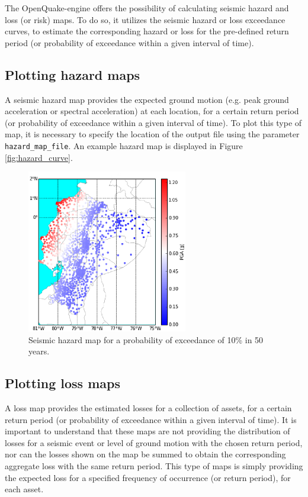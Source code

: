 The OpenQuake-engine offers the possibility of calculating seismic hazard and loss (or risk) maps. To do so, it utilizes the seismic hazard or loss exceedance curves, to estimate the corresponding hazard or loss for the pre-defined return period (or probability of exceedance within a given interval of time).

\subsection{Plotting hazard maps}
\label{subsec:plot-hazard_maps}
A seismic hazard map provides the expected ground motion (e.g. peak ground acceleration or spectral acceleration) at each location, for a certain return period (or probability of exceedance within a given interval of time). To plot this type of map, it is necessary to specify the location of the output file using the parameter \verb=hazard_map_file=. An example hazard map is displayed in Figure \ref{fig:hazard_curve}.

\begin{figure}[htb]
  \centering
      \includegraphics[width=7cm]{figures/hazard_Ecuador.eps}
  \caption{Seismic hazard map for a probability of exceedance of 10\% in 50 years.}
  \label{fig:hazard_map}
\end{figure}

\subsection{Plotting loss maps}
\label{subsec:plot-loss_maps}
A loss map provides the estimated losses for a collection of assets, for a certain return period (or probability of exceedance within a given interval of time). It is important to understand that these maps are not providing the distribution of losses for a seismic event or level of ground motion with the chosen return period, nor can the losses shown on the map be summed to obtain the corresponding aggregate loss with the same return period. This type of maps is simply providing the expected loss for a specified frequency of occurrence (or return period), for each asset.

